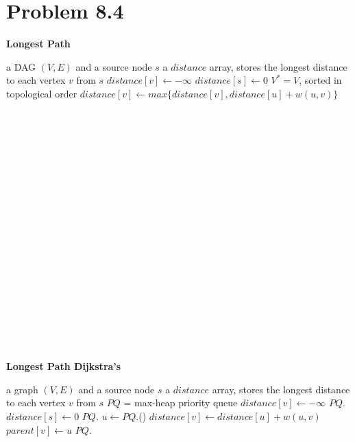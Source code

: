 \documentclass[12pt,letterpaper]{article}
\newcommand\hwnum{8}                  %
\newenvironment{answer}[1]{
  \section*{Problem \hwnum.#1}
}{\newpage}
\begin{document}
\newcommand{\tabb}[1]{\hspace{.2\textwidth}\rlap{#1}}

\begin{answer}{4}

\textbf{Longest Path} \\

\begin{algorithmic}
\tt{

	\Require a DAG $(V, E)$ and a source node $s$
	\Ensure a $distance$ array, stores the longest distance to each vertex $v$ from $s$
    	\State $distance[v] \leftarrow -\infty$
    \EndFor
    \State $distance[s] \leftarrow 0$
    \State $V^* = V$, sorted in topological order
        \State $distance[v] \leftarrow max\{distance[v], distance[u] + w(u,v)\}$
        \EndFor
    \EndFor
\EndFunction
}
\end{algorithmic}

\begin{verbatim}






















\end{verbatim}

\textbf{Longest Path Dijkstra's} \\

\begin{algorithmic}
\tt{

	\Require a graph $(V, E)$ and a source node $s$
	\Ensure a $distance$ array, stores the longest distance to each vertex $v$ from $s$
    \State $PQ$ = max-heap priority queue
    	\State $distance[v] \leftarrow -\infty$
        \State $PQ$.
    \EndFor
    \State $distance[s] \leftarrow 0$
    \State $PQ$.
    	\State $u \leftarrow PQ.$()
        	\State $distance[v] \leftarrow distance[u] + w(u, v)$
            \State $parent[v] \leftarrow u$
            \State $PQ.$
        \EndIf
        \EndFor
    \EndWhile
\EndFunction
}
\end{algorithmic}


\end{answer}
\end{document}
